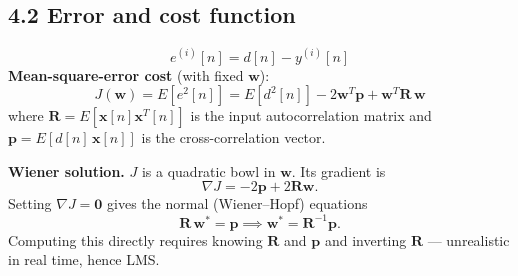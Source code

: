 \documentclass[11pt,a4paper]{article}
\begin{document}
\subsection{4.2 Error and cost function}
\begin{equation}
e^{(i)}[n] = d[n] - y^{(i)}[n]
\end{equation}
\textbf{Mean-square-error cost} (with fixed $\mathbf{w}$):
\begin{equation}
J(\mathbf{w}) = E[e^2[n]] = E[d^2[n]] - 2\mathbf{w}^T\mathbf{p} + \mathbf{w}^T\mathbf{R}\,\mathbf{w}
\end{equation}
where $\mathbf{R} = E[\mathbf{x}[n]\mathbf{x}^T[n]]$ is the input autocorrelation matrix and $\mathbf{p} = E[d[n]\,\mathbf{x}[n]]$ is the cross-correlation vector.

\textbf{Wiener solution.} $J$ is a quadratic bowl in $\mathbf{w}$. Its gradient is
\begin{equation}
\nabla J = -2\mathbf{p} + 2\mathbf{R}\mathbf{w}.
\end{equation}
Setting $\nabla J = \mathbf{0}$ gives the normal (Wiener--Hopf) equations
\begin{equation}
\mathbf{R}\,\mathbf{w}^\ast = \mathbf{p} \implies \mathbf{w}^\ast = \mathbf{R}^{-1}\mathbf{p}.
\end{equation}
Computing this directly requires knowing $\mathbf{R}$ and $\mathbf{p}$ and inverting $\mathbf{R}$ --- unrealistic in real time, hence LMS.
\end{document}
